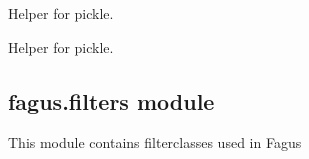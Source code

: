 \documentclass[a4paper,10pt,english]{sphinxmanual}
\begin{document}
\begin{fulllineitems}
\begin{fulllineitems}
\end{fulllineitems}


\begin{fulllineitems}
\label{\detokenize{fagus.fagus:fagus.fagus.Fagus.__reduce__}}
\pysigstartsignatures
{}
\pysigstopsignatures
\sphinxAtStartPar
Helper for pickle.

\end{fulllineitems}


\begin{fulllineitems}
\label{\detokenize{fagus.fagus:fagus.fagus.Fagus.__reduce_ex__}}
\pysigstartsignatures
{}
\pysigstopsignatures
\sphinxAtStartPar
Helper for pickle.

\end{fulllineitems}


\end{fulllineitems}


\sphinxstepscope


\subsection{fagus.filters module}
\label{\detokenize{fagus.filters:module-fagus.filters}}\label{\detokenize{fagus.filters:fagus-filters-module}}\label{\detokenize{fagus.filters::doc}}
\sphinxAtStartPar
This module contains filter\sphinxhyphen{}classes used in Fagus
\end{document}
